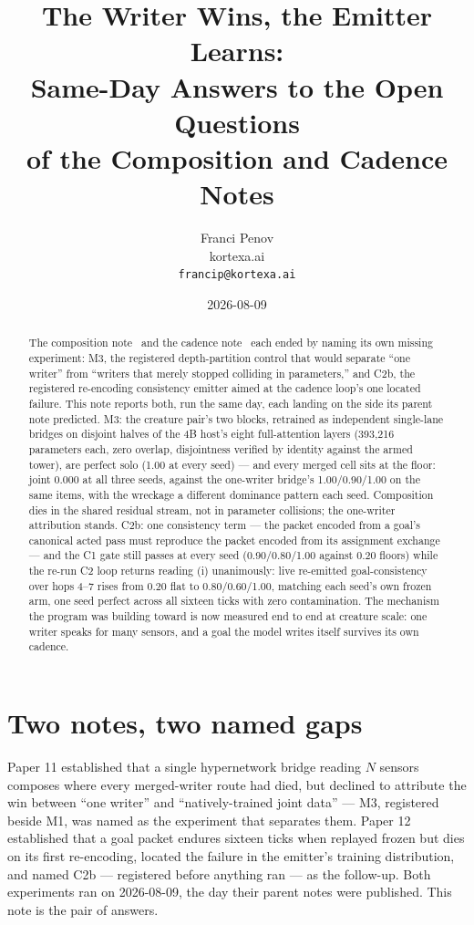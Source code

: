 \documentclass[11pt]{article}
\title{The Writer Wins, the Emitter Learns:\\Same-Day Answers to the Open Questions\\of the Composition and Cadence Notes}
\author{Franci Penov \\ kortexa.ai \\ \texttt{francip@kortexa.ai}}
\date{2026-08-09}
\begin{document}
\maketitle

\begin{abstract}
The composition note~\cite{penov2026thirdblock} and the cadence
note~\cite{penov2026carrier} each ended by naming its own missing
experiment: M3, the registered depth-partition control that would
separate ``one writer'' from ``writers that merely stopped colliding in
parameters,'' and C2b, the registered re-encoding consistency emitter
aimed at the cadence loop's one located failure. This note reports both,
run the same day, each landing on the side its parent note predicted.
M3: the creature pair's two blocks, retrained as independent single-lane
bridges on disjoint halves of the 4B host's eight full-attention layers
(393,216 parameters each, zero overlap, disjointness verified by
identity against the armed tower), are perfect solo
(1.00 at every seed) --- and every merged cell
sits at the floor: joint 0.000 at all three seeds, against the
one-writer bridge's 1.00/0.90/1.00 on the same items, with the
wreckage a different dominance pattern each seed. Composition dies in
the shared residual stream, not in parameter collisions; the one-writer
attribution stands. C2b: one consistency term --- the packet encoded
from a goal's canonical acted pass must reproduce the packet encoded
from its assignment exchange --- and the C1 gate still passes at every
seed (0.90/0.80/1.00 against 0.20 floors) while the re-run C2 loop
returns reading (i) unanimously: live re-emitted goal-consistency over
hops 4--7 rises from 0.20 flat to 0.80/0.60/1.00, matching each
seed's own frozen arm, one seed perfect across all sixteen ticks with
zero contamination. The mechanism the program was building toward is
now measured end to end at creature scale: one writer speaks for many
sensors, and a goal the model writes itself survives its own cadence.
\end{abstract}

\section{Two notes, two named gaps}

Paper 11 established that a single hypernetwork bridge reading $N$
sensors composes where every merged-writer route had died, but declined
to attribute the win between ``one writer'' and ``natively-trained
joint data'' --- M3, registered beside M1, was named as the experiment
that separates them. Paper 12 established that a goal packet endures
sixteen ticks when replayed frozen but dies on its first re-encoding,
located the failure in the emitter's training distribution, and named
C2b --- registered before anything ran --- as the follow-up. Both
experiments ran on 2026-08-09, the day their parent notes were
published. This note is the pair of answers.
\end{document}
